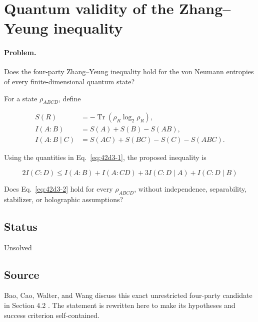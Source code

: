 \section{Quantum validity of the Zhang--Yeung inequality}
\label{sec:op_42d3766b44e3a89b}

\paragraph{Problem.}
Does the four-party Zhang--Yeung inequality hold for the von Neumann entropies of every finite-dimensional quantum state?

For a state $\rho_{ABCD}$, define

\begin{equation}
\begin{aligned}
S(R)&=-\operatorname{Tr}(\rho_R\log_2\rho_R),\\
I(A:B)&=S(A)+S(B)-S(AB),\\
I(A:B\mid C)&=S(AC)+S(BC)-S(C)-S(ABC).
\end{aligned}
\label{eq:42d3-1}
\end{equation}

Using the quantities in Eq.~\eqref{eq:42d3-1}, the proposed inequality is

\begin{equation}
2I(C:D)\leq I(A:B)+I(A:CD)+3I(C:D\mid A)+I(C:D\mid B)
\label{eq:42d3-2}
\end{equation}

Does Eq.~\eqref{eq:42d3-2} hold for every $\rho_{ABCD}$, without independence, separability, stabilizer, or holographic assumptions?

\subsection*{Status}

Unsolved

\subsection*{Source}

Bao, Cao, Walter, and Wang discuss this exact unrestricted four-party candidate in Section 4.2 . The statement is rewritten here to make its hypotheses and success criterion self-contained.

